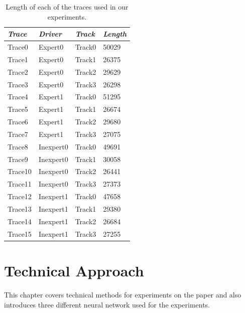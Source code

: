 \documentclass[draft,dvipsnames]{drexel-thesis}
\begin{document}
\begin{thesis}
\begin{table}[!t]
\centering
\caption{Length of each of the traces used in our experiments.}
\label{tbl:traces}
\begin{tabular}{|l|l|l|l|}
\hline
{\em Trace}   & {\em Driver}    & {\em Track}  & {\em Length} \\ \hline
Trace0  & Expert0   & Track0 & 50029  \\
Trace1  & Expert0   & Track1 & 26375  \\
Trace2  & Expert0   & Track2 & 29629  \\
Trace3  & Expert0   & Track3 & 26298  \\
Trace4  & Expert1   & Track0 & 51295  \\
Trace5  & Expert1   & Track1 & 26674  \\
Trace6  & Expert1   & Track2 & 29680  \\
Trace7  & Expert1   & Track3 & 27075  \\
Trace8  & Inexpert0 & Track0 & 49691  \\
Trace9  & Inexpert0 & Track1 & 30058  \\
Trace10 & Inexpert0 & Track2 & 26441  \\
Trace11 & Inexpert0 & Track3 & 27373  \\
Trace12 & Inexpert1 & Track0 & 47658  \\
Trace13 & Inexpert1 & Track1 & 29380  \\
Trace14 & Inexpert1 & Track2 & 26684  \\
Trace15 & Inexpert1 & Track3 & 27255  \\ \hline
\end{tabular}
\end{table}


\chapter{Technical Approach}\label{chap:tech_approach}

This chapter covers technical methods for experiments on the paper and also introduces three different neural network used for the experiments.



\end{thesis}
\end{document}
